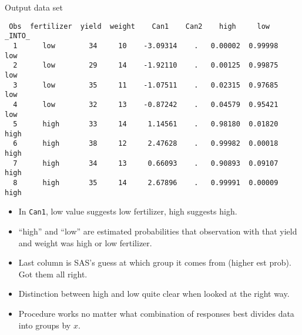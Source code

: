 \documentclass[pdf]{prosper}
\begin{document}
\begin{slide}{Output data set}

{\scriptsize
\begin{verbatim}
 Obs  fertilizer  yield  weight    Can1    Can2    high     low    _INTO_
  1      low        34     10    -3.09314    .   0.00002  0.99998   low  
  2      low        29     14    -1.92110    .   0.00125  0.99875   low  
  3      low        35     11    -1.07511    .   0.02315  0.97685   low  
  4      low        32     13    -0.87242    .   0.04579  0.95421   low  
  5      high       33     14     1.14561    .   0.98180  0.01820   high 
  6      high       38     12     2.47628    .   0.99982  0.00018   high 
  7      high       34     13     0.66093    .   0.90893  0.09107   high 
  8      high       35     14     2.67896    .   0.99991  0.00009   high 
\end{verbatim}
}

\begin{itemize}
\item In \verb-Can1-,
 low value suggests low fertilizer, high suggests high.
\item ``high'' and ``low'' are estimated probabilities that observation with that yield and weight was high or low fertilizer.
\item Last column is SAS's guess at which group it comes from (higher est prob). Got them all right.
\item Distinction between high and low quite clear when looked at the right way.
\item Procedure works no matter what combination of responses best divides data into groups by $x$. 
\end{itemize}
  
\end{slide}
\end{document}
